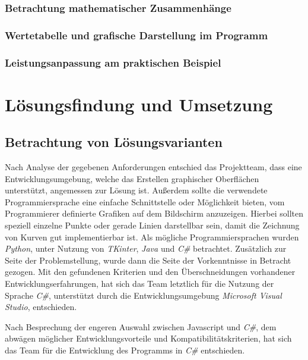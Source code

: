 \documentclass{article}
\begin{document}
    \subsubsection{Betrachtung mathematischer Zusammenhänge}

    \subsubsection{Wertetabelle und grafische Darstellung im Programm}

    \subsubsection{Leistungsanpassung am praktischen Beispiel}

\newpage
\section{Lösungsfindung und Umsetzung}

\subsection{Betrachtung von Lösungsvarianten}

    Nach Analyse der gegebenen Anforderungen entschied das Projektteam, dass eine Entwicklungsumgebung, welche das Erstellen graphischer Oberflächen unterstützt, angemessen zur Lösung ist. Außerdem sollte die verwendete Programmiersprache eine einfache Schnittstelle oder Möglichkeit bieten, vom Programmierer definierte Grafiken auf dem Bildschirm anzuzeigen. Hierbei sollten speziell einzelne Punkte oder gerade Linien darstellbar sein, damit die Zeichnung von Kurven gut implementierbar ist.
    Als mögliche Programmiersprachen wurden \textit{\glqq Python\grqq{}}, unter Nutzung von \textit{\glqq TKinter\grqq{}}, \textit{\glqq Java\grqq{}} und \textit{\glqq C\#\grqq{}} betrachtet.
    Zusätzlich zur Seite der Problemstellung, wurde dann die Seite der Vorkenntnisse in Betracht gezogen. Mit den gefundenen Kriterien und den Überschneidungen vorhandener Entwicklungserfahrungen, hat sich das Team letztlich für die Nutzung der Sprache \textit{\glqq C\#\grqq{}}, unterstützt durch die Entwicklungsumgebung \textit{\glqq Microsoft Visual Studio\grqq{}}, entschieden.

    Nach Besprechung der engeren Auswahl zwischen Javascript und \textit{\glqq C\#\grqq{}}, dem abwägen möglicher Entwicklungsvorteile und Kompatibilitätskriterien, hat sich das Team für die Entwicklung des Programms in \textit{\glqq C\#\grqq{}} entschieden.
\end{document}
